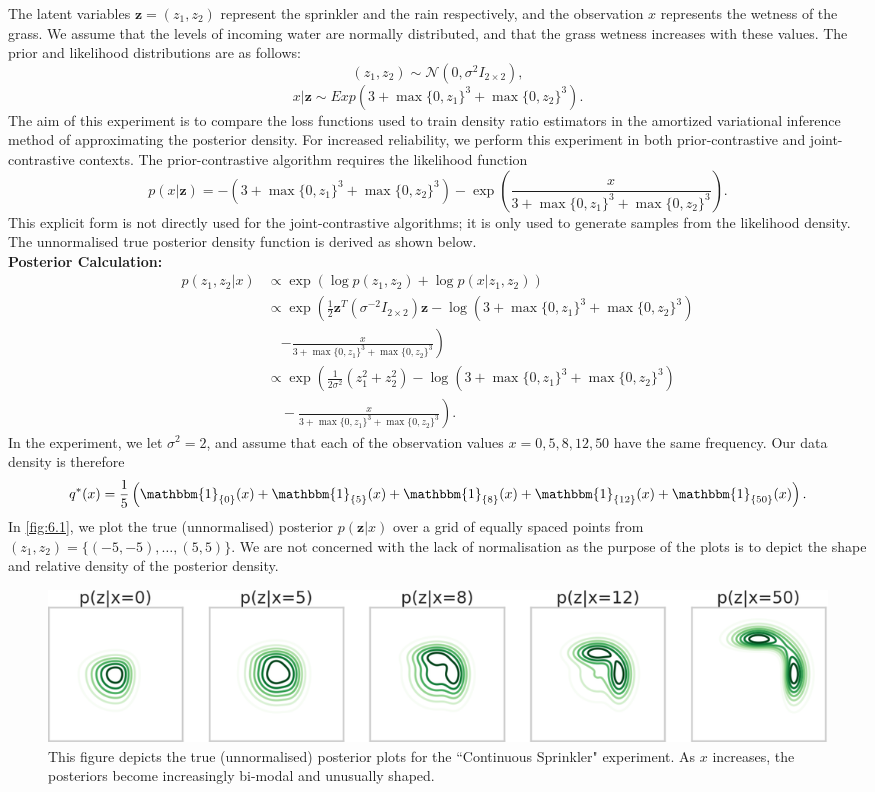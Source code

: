 \documentclass[honours,12pt, twoside]{unswthesis}
\numberwithin{equation}{section}
\theoremstyle{definition}
\begin{document}
The latent variables $\bm{z}=(z_1, z_2)$ represent the sprinkler and the rain respectively, and the observation $x$ represents the wetness of the grass. We assume that the levels of incoming water are normally distributed, and that the grass wetness increases with these values. The prior and likelihood distributions are as follows:
\[(z_1,z_2)\sim \mathcal{N} (0,\sigma^2 I_{2\times 2}),\]
\[x|\bm{z}\sim Exp(3+\max\{0,z_1\}^3+\max\{0,z_2\}^3).\]
The aim of this experiment is to compare the loss functions used to train density ratio estimators in the amortized variational inference method of approximating the posterior density. For increased reliability, we perform this experiment in both prior-contrastive and joint-contrastive contexts. The prior-contrastive algorithm requires the likelihood function
\[p(x|\bm{z})=-(3+\max \{0,z_1\}^3+\max\{0,z_2\}^3)-\exp\left(\frac{x}{3+\max \{0,z_1\}^3+\max\{0,z_2\}^3}\right).\]
This explicit form is not directly used for the joint-contrastive algorithms; it is only used to generate samples from the likelihood density.\\
The unnormalised true posterior density function is derived as shown below.\\
\textbf{Posterior Calculation:}
\begin{equation}
\begin{aligned}
p(z_1,z_2|x)&\propto \exp(\log p(z_1,z_2)+\log p(x|z_1,z_2))\\
&\propto\exp\left(\frac12\bm{z}^T(\sigma^{-2}I_{2\times 2})\bm{z}-\log (3+\max\{0,z_1\}^3+\max\{0,z_2\}^3)\right.\\
&\quad\left.-\frac{x}{3+\max\{0,z_1\}^3+\max\{0,z_2\}^3}\right)\\
&\propto \exp\left(\frac{1}{2\sigma^2}(z_1^2+z_2^2)-\log (3+\max\{0,z_1\}^3+\max\{0,z_2\}^3)\right.\\
&\left.\quad-\frac{x}{3+\max\{0,z_1\}^3+\max\{0,z_2\}^3}\right).
\end{aligned}
\end{equation}
In the experiment, we let $\sigma^2=2$, and assume that each of the observation values $x=0,5,8,12,50$ have the same frequency. Our data density is therefore
\[q^*(x)= \frac{1}{5}\left(\mathbbm{1}_{\{0\}}(x)+\mathbbm{1}_{\{5\}}(x)+\mathbbm{1}_{\{8\}}(x)+\mathbbm{1}_{\{12\}}(x)+\mathbbm{1}_{\{50\}}(x)\right).\] In \autoref{fig:6.1}, we plot the true (unnormalised) posterior $p(\bm{z}|x)$ over a grid of equally spaced points from $(z_1,z_2)=\{(-5,-5),\dots, (5,5)\}$. We are not concerned with the lack of normalisation as the purpose of the plots is to depict the shape and relative density of the posterior density.
\begin{figure}[h]
\includegraphics[width=\textwidth]{sprinklertrue.png}
\caption{\small This figure depicts the true (unnormalised) posterior plots for the ``Continuous Sprinkler" experiment. As $x$ increases, the posteriors become increasingly bi-modal and unusually shaped.}
\label{fig:6.1}
\end{figure}
\end{document}
